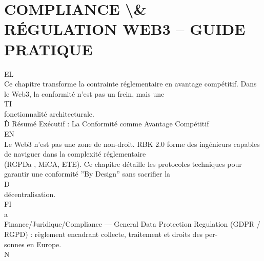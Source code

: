 \section{COMPLIANCE \textbackslash{}& RÉGULATION WEB3 – GUIDE PRATIQUE}
\vspace{0.5em}
\vspace{0.5em}
\vspace{0.5em}
\vspace{0.5em}
EL\\
Ce chapitre transforme la contrainte réglementaire en avantage compétitif. Dans le Web3, la conformité n’est pas un frein, mais une\\
\vspace{0.5em}
\vspace{0.5em}
\vspace{0.5em}
\vspace{0.5em}
TI\\
fonctionnalité architecturale.\\
\vspace{0.5em}
Ď Résumé Exécutif : La Conformité comme Avantage Compétitif\\
\vspace{0.5em}
\vspace{0.5em}
\vspace{0.5em}
\vspace{0.5em}
EN\\
Le Web3 n’est pas une zone de non-droit. RBK 2.0 forme des ingénieurs capables de naviguer dans la complexité réglementaire\\
(RGPDa , MiCA, ETE). Ce chapitre détaille les protocoles techniques pour garantir une conformité ”By Design” sans sacrifier la\\
\vspace{0.5em}
\vspace{0.5em}
\vspace{0.5em}
\vspace{0.5em}
D\\
décentralisation.\\
\vspace{0.5em}
\vspace{0.5em}
\vspace{0.5em}
FI\\
a\\
Finance/Juridique/Compliance — General Data Protection Regulation (GDPR / RGPD) : règlement encadrant collecte, traitement et droits des per-\\
sonnes en Europe.\\
N\\

